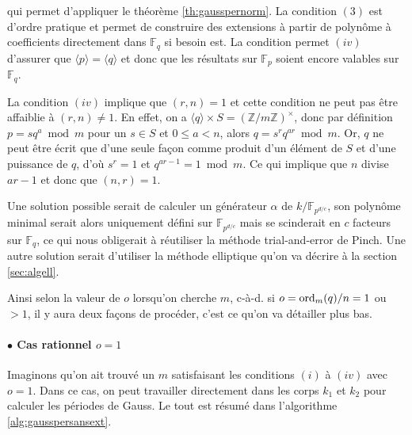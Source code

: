 \documentclass[a4paper]{article} %
\numberwithin{section}{part}
\numberwithin{equation}{section}
\newcommand\zmodninv[1]{(\mathbb{Z}/#1\mathbb{Z})^{\times}}
\newcommand\GF[1]{\mathbb{F}_{#1}}
\newcommand\groupgen[1]{\langle{#1}\rangle}
\newcommand\ord[2]{\textup{ord}_{#1}(#2)}
\begin{document}
qui permet d'appliquer le théorème \ref{th:gausspernorm}. La condition $(3)$ est
d'ordre pratique et permet de construire des extensions à partir de polynôme à 
coefficients directement dans $\GF{q}$ si besoin est. La condition permet $(iv)$
d'assurer que $\groupgen{p} = \groupgen{q}$ et donc que les résultats sur
$\GF{p}$ soient encore valables sur $\GF{q}$.
\begin{rem}
La condition $(iv)$ implique que $(r,n) = 1$ et cette condition ne peut pas être
affaiblie à $(r,n)\neq1$. En effet, on a $\groupgen{q}\times S = \zmodninv{m}$, 
donc par définition $p = sq^a\bmod m$ pour un $s\in S$ et $0 \leq a < n$, alors 
$q=s^rq^{ar} \bmod m$. Or, $q$ ne peut être écrit que d'une seule façon comme 
produit d'un élément de $S$ et d'une puissance de $q$, d'où $s^r = 1$ et $q^{ar 
- 1} = 1 \bmod m$. Ce qui implique que $n$ divise $ar - 1$ et donc que $(n, r) =
1$.\par
Une solution possible serait de calculer un générateur $\alpha$ de 
$k/\GF{p^{d/c}}$, son polynôme minimal serait alors uniquement défini sur 
$\GF{p^{d/c}}$ mais se scinderait en $c$ facteurs sur $\GF{q}$, ce qui nous 
obligerait à réutiliser la méthode trial-and-error de Pinch. Une autre solution
serait d'utiliser la méthode elliptique qu'on va décrire à la section
\ref{sec:algell}.
\end{rem}
\vspace{0.3cm}
Ainsi selon la valeur de $o$ lorsqu'on cherche $m$, c-à-d. si $o = 
\ord{m}{q} /n = 1$ ou $> 1$, il y aura deux façons de procéder, c'est ce qu'on 
va détailler plus bas.
\paragraph{$\bullet$ Cas rationnel $o = 1$}
Imaginons qu'on ait trouvé un $m$ satisfaisant les conditions $(i)$ à $(iv)$ 
avec $o = 1$. Dans ce cas, on peut travailler directement dans les corps $k_1$ 
et $k_2$ pour calculer les périodes de Gauss. Le tout est résumé dans 
l'algorithme \ref{alg:gausspersansext}.
\end{document}
